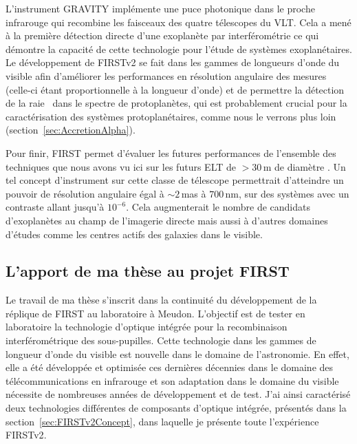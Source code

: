 L'instrument \ac{GRAVITY} implémente une puce photonique \citep{perraut2018} dans le proche infrarouge qui recombine les faisceaux des quatre télescopes du \ac{VLT}. Cela a mené à la première détection directe d'une exoplanète par interférométrie \citep{lacour2019} ce qui démontre la capacité de cette technologie pour l'étude de systèmes exoplanétaires. Le développement de \ac{FIRSTv2} se fait dans les gammes de longueurs d'onde du visible afin d'améliorer les performances en résolution angulaire des mesures (celle-ci étant proportionnelle à la longueur d'onde) et de permettre la détection de la raie \ha~dans le spectre de protoplanètes, qui est probablement crucial pour la caractérisation des systèmes protoplanétaires, comme nous le verrons plus loin (section~\ref{sec:AccretionAlpha}).

Pour finir, \ac{FIRST} permet d'évaluer les futures performances de l'ensemble des techniques que nous avons vu ici sur les futurs \ac{ELT} de $> 30 \,$m de diamètre \citep{vievard2020b}. Un tel concept d'instrument sur cette classe de télescope permettrait d'atteindre un pouvoir de résolution angulaire égal à $\sim 2 \,$mas à $700 \,$nm, sur des systèmes avec un contraste allant jusqu'à $10 ^{-6}$. Cela augmenterait le nombre de candidats d'exoplanètes au champ de l'imagerie directe mais aussi à d'autres domaines d'études comme les centres actifs des galaxies dans le visible.


\subsection{L'apport de ma thèse au projet FIRST}

Le travail de ma thèse s'inscrit dans la continuité du développement de la réplique de \ac{FIRST} au laboratoire à Meudon. L'objectif est de tester en laboratoire la technologie d'optique intégrée pour la recombinaison interférométrique des sous-pupilles. Cette technologie dans les gammes de longueur d'onde du visible est nouvelle dans le domaine de l'astronomie. En effet, elle a été développée et optimisée ces dernières décennies dans le domaine des télécommunications en infrarouge et son adaptation dans le domaine du visible nécessite de nombreuses années de développement et de test. J'ai ainsi caractérisé deux technologies différentes de composants d'optique intégrée, présentés dans la section~\ref{sec:FIRSTv2Concept}, dans laquelle je présente toute l'expérience \ac{FIRSTv2}. 

